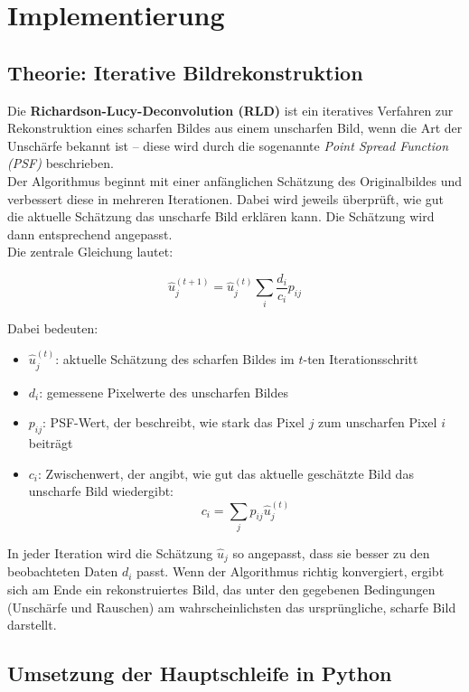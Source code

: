\section{Implementierung}

\subsection{Theorie: Iterative Bildrekonstruktion}

Die \textbf{Richardson-Lucy-Deconvolution (RLD)} ist ein iteratives Verfahren zur Rekonstruktion eines scharfen Bildes aus einem unscharfen Bild, wenn die Art der Unschärfe bekannt ist – diese wird durch die sogenannte \textit{Point Spread Function (PSF)} beschrieben. \\

\noindent
Der Algorithmus beginnt mit einer anfänglichen Schätzung des Originalbildes und verbessert diese in mehreren Iterationen. Dabei wird jeweils überprüft, wie gut die aktuelle Schätzung das unscharfe Bild erklären kann. Die Schätzung wird dann entsprechend angepasst. \\

Die zentrale Gleichung lautet:

\[
\hat{u}_j^{(t+1)} = \hat{u}_j^{(t)} \sum_i \frac{d_i}{c_i} p_{ij}
\]

Dabei bedeuten:

\begin{itemize}
    \item \( \hat{u}_j^{(t)} \): aktuelle Schätzung des scharfen Bildes im \( t \)-ten Iterationsschritt
    \item \( d_i \): gemessene Pixelwerte des unscharfen Bildes
    \item \( p_{ij} \): PSF-Wert, der beschreibt, wie stark das Pixel \( j \) zum unscharfen Pixel \( i \) beiträgt
    \item \( c_i \): Zwischenwert, der angibt, wie gut das aktuelle geschätzte Bild das unscharfe Bild wiedergibt:
    \[
    c_i = \sum_j p_{ij} \hat{u}_j^{(t)}
    \]
\end{itemize}

In jeder Iteration wird die Schätzung \( \hat{u}_j \) so angepasst, dass sie besser zu den beobachteten Daten \( d_i \) passt. Wenn der Algorithmus richtig konvergiert, ergibt sich am Ende ein rekonstruiertes Bild, das unter den gegebenen Bedingungen (Unschärfe und Rauschen) am wahrscheinlichsten das ursprüngliche, scharfe Bild darstellt.

\newpage
\subsection{Umsetzung der Hauptschleife in Python}


